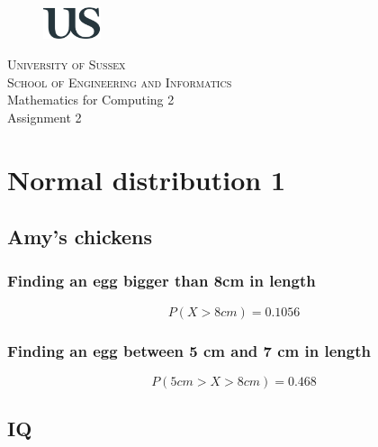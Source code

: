 \documentclass[12pt]{article}
\begin{document}
\begin{titlepage}
\begin{figure}[t]
    \centering\includegraphics[width=0.15\textwidth]{logo}
\end{figure}
\begin{center}
    \textsc{ \LARGE{University of Sussex \\}}
	\textsc{School of Engineering and Informatics\\}
	\vspace{12mm}
	\fontsize{6mm}{7mm}\textnormal{Mathematics for Computing 2\\}
	\fontsize{10mm}{7mm}\selectfont
	\vspace{2mm}
    \textup{Assignment 2}\\
\end{center}

\vspace{25mm}


\end{titlepage}
\tableofcontents

\clearpage

\section{Normal distribution 1}

\subsection{Amy's chickens}

\subsubsection{Finding an egg bigger than 8cm in length}

\[P(X > 8cm) = 0.1056\]

\subsubsection{Finding an egg between 5 cm and 7 cm in length}

\[P(5cm > X > 8cm) = 0.468\]

\subsection{IQ}
\end{document}

